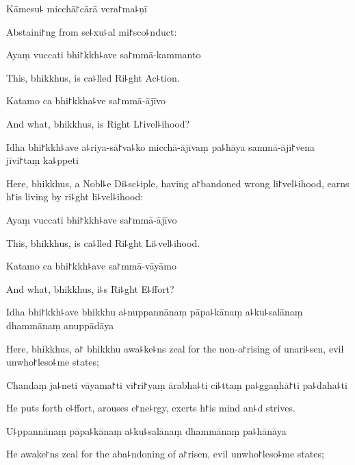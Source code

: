Kāmesu꜕ micchā꜓cārā vera꜓ma꜕ṇī

\begin{english}
  Abstaini꜓ng from se꜕xu꜕al mi꜓sco꜕nduct:
\end{english}

Ayaṃ vuccati bhi꜓kkh꜕ave sa꜓mmā-kammanto

\begin{english}
  This, bhikkhus, is ca꜕lled Ri꜕ght Ac꜕tion.
\end{english}

Katamo ca bhi꜓kkha꜕ve sa꜓mmā-ājīvo

\begin{english}
  And what, bhikkhus, is Right L꜓ivel꜕ihood?
\end{english}

Idha bhi꜓kkh꜕ave a꜕riya-sā꜓va꜕ko micchā-ājīvaṃ pa꜕hāya sammā-ājī꜓vena jīvi꜓taṃ ka꜕ppeti

\begin{english}
  Here, bhikkhus, a Nobl꜕e Di꜕sc꜕iple, having a꜓bandoned wrong li꜓vel꜕ihood, earns h꜓is living by ri꜕ght li꜕vel꜕ihood:
\end{english}

Ayaṃ vuccati bhi꜓kkh꜕ave sa꜓mmā-ājīvo

\begin{english}
  This, bhikkhus, is ca꜕lled Ri꜕ght Li꜕vel꜕ihood.
\end{english}

Katamo ca bhi꜓kkh꜕ave sa꜓mmā-vāyāmo

\begin{english}
  And what, bhikkhus, i꜕s Ri꜕ght E꜕ffort?
\end{english}

Idha bhi꜓kkh꜕ave bhikkhu a꜕nuppannānaṃ pāpa꜕kānaṃ a꜕ku꜕salānaṃ dhammānaṃ anuppādāya

\begin{english}
  Here, bhikkhus, a꜓ bhikkhu awa꜕ke꜕ns zeal for the non-a꜓rising of unari꜕sen, evil unwho꜓leso꜕me states;
\end{english}

Chandaṃ ja꜕neti vāyama꜓ti vī꜓ri꜓yaṃ ārabha꜕ti ci꜕ttaṃ pa꜕ggaṇhā꜓ti pa꜕daha꜕ti

\begin{english}
  He puts forth e꜕ffort, arouses e꜓ne꜕rgy, exerts h꜓is mind an꜕d strives.
\end{english}

U꜕ppannānaṃ pāpa꜕kānaṃ a꜕ku꜕salānaṃ dhammānaṃ pa꜕hānāya

\begin{english}
  He awake꜓ns zeal for the aba꜕ndoning of a꜓risen, evil unwho꜓leso꜕me states;
\end{english}

